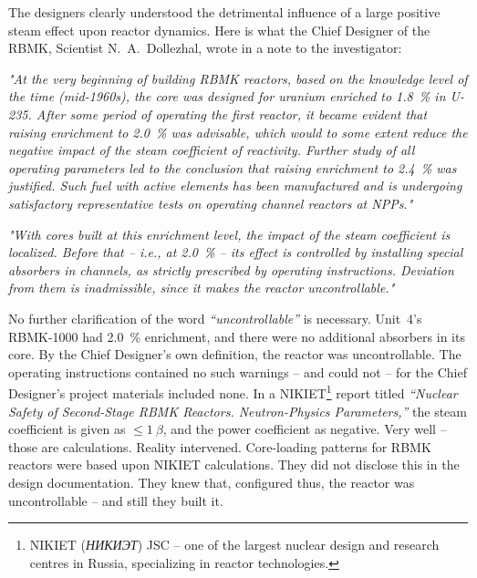 \documentclass[openright]{bookest}
\begin{document}
The designers clearly understood the detrimental influence of a large positive steam effect upon reactor dynamics. Here is what the Chief Designer of the RBMK, Scientist N.~A.~Dollezhal, wrote in a note to the investigator:

\begin{personal}
\par \textit{"At the very beginning of building RBMK reactors, based on the knowledge level of the time (mid-1960s), the core was designed for uranium enriched to \qty{1.8}{\percent} in U-235. After some period of operating the first reactor, it became evident that raising enrichment to \qty{2.0}{\percent} was advisable, which would to some extent reduce the negative impact of the steam coefficient of reactivity. Further study of all operating parameters led to the conclusion that raising enrichment to \qty{2.4}{\percent} was justified. Such fuel with active elements has been manufactured and is undergoing satisfactory representative tests on operating channel reactors at NPPs."}
\par \textit{"With cores built at this enrichment level, the impact of the steam coefficient is localized. Before that -- i.e., at \qty{2.0}{\percent} -- its effect is controlled by installing special absorbers in channels, as strictly prescribed by operating instructions. Deviation from them is inadmissible, since it makes the reactor uncontrollable."}
\end{personal}

No further clarification of the word \textit{``uncontrollable''} is necessary. Unit~4's RBMK-1000 had \qty{2.0}{\percent} enrichment, and there were no additional absorbers in its core. By the Chief Designer's own definition, the reactor was uncontrollable. The operating instructions contained no such warnings -- and could not -- for the Chief Designer's project materials included none. In a NIKIET\footnote{NIKIET (\textit{НИКИЭТ}) JSC -- one of the largest nuclear design and research centres in Russia, specializing in reactor technologies.} report titled \textit{``Nuclear Safety of Second-Stage RBMK Reactors. Neutron-Physics Parameters,''} the steam coefficient is given as $\leq \qty{1}{\beta}$, and the power coefficient as negative. Very well -- those are calculations. Reality intervened. Core-loading patterns for RBMK reactors were based upon NIKIET calculations. They did not disclose this in the design documentation. They knew that, configured thus, the reactor was uncontrollable -- and still they built it.
\end{document}
